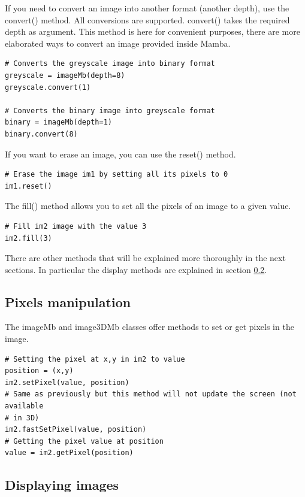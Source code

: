 \documentclass[a4paper,10pt,oneside]{article}
\begin{document}
If you need to convert an image into another format (another depth), use the 
convert() method. All conversions are supported. convert() takes the required
depth as argument. This method is here for convenient purposes, there are more
elaborated ways to convert an image provided inside Mamba.

\lstset{language=Python}
\begin{lstlisting}
# Converts the greyscale image into binary format
greyscale = imageMb(depth=8)
greyscale.convert(1)

# Converts the binary image into greyscale format
binary = imageMb(depth=1)
binary.convert(8)
\end{lstlisting}

If you want to erase an image, you can use the reset() method. 

\lstset{language=Python}
\begin{lstlisting}
# Erase the image im1 by setting all its pixels to 0
im1.reset()
\end{lstlisting}

The fill() method allows you to set all the pixels of an image to a given value.

\lstset{language=Python}
\begin{lstlisting}
# Fill im2 image with the value 3
im2.fill(3)
\end{lstlisting}

There are other methods that will be explained more thoroughly in the next
sections. In particular the display methods are explained in section 
\ref{cha:disp_im}.

\subsection{Pixels manipulation}

The imageMb and image3DMb classes offer methods to set or get pixels
in the image.

\lstset{language=Python}
\begin{lstlisting}
# Setting the pixel at x,y in im2 to value
position = (x,y)
im2.setPixel(value, position)
# Same as previously but this method will not update the screen (not available
# in 3D)
im2.fastSetPixel(value, position)
# Getting the pixel value at position
value = im2.getPixel(position)
\end{lstlisting}

\subsection{Displaying images}
\label{cha:disp_im}
\end{document}
